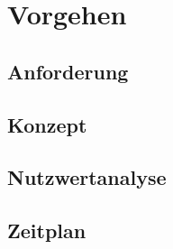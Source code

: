 \chapter{Vorgehen}
\label{cha:vorgehen}

%
%
%
%
%
%
%

\section{Anforderung}
\section{Konzept}
\section{Nutzwertanalyse}
\section{Zeitplan}